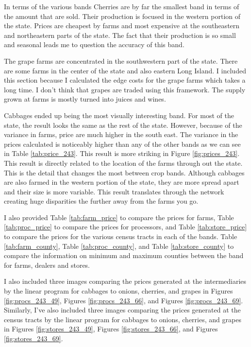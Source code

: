\documentclass{report}
\begin{document}
In terms of the various bands Cherries are by far the smallest band in terms of the amount that are sold. Their production is focused in the western portion of the state. Prices are cheapest by farms and most expensive at the southeastern and northeastern parts of the state. The fact that their production is so small and seasonal leads me to question the accuracy of this band. 

The grape farms are concentrated in the southwestern part of the state. There are some farms in the center of the state and also eastern Long Island. I included this section because I calculated the edge costs for the grape farms which takes a long time. I don't think that grapes  are traded using this framework. The supply grown at farms is mostly turned into juices and wines.

Cabbages ended up being the most visually interesting band. For most of the state, the result looks the same as the rest of the state. However, because of the variance in farms, price are much higher in the south east. The variance in the prices calculated is noticeably higher than any of the other bands as we can see in Table \ref{tab:price_243}. This result is more striking in Figure \ref{fig:prices_243}. This result is directly related to the location of the farms through out the state. This is the detail that changes the most between crop bands. Although cabbages are also farmed in the western portion of the state, they are more spread apart and their size is more variable. This result translates through the network creating huge disparities the further away from the farms you go.

I also provided Table \ref{tab:farm_price} to compare the prices for farms, Table \ref{tab:proc_price} to compare the prices for processors, and Table \ref{tab:store_price} to compare the prices for the various census tracts in each of the bands. Table \ref{tab:farm_county}, Table \ref{tab:proc_county}, and Table \ref{tab:store_county} to compare the information on minimum and maximum counties between the band for farms, dealers and stores.

I also included three images comparing the prices generated at the intermediaries by the linear program for cabbages to onions, cherries, and grapes in Figures \ref{fig:procs_243_49}, Figures \ref{fig:procs_243_66}, and Figures \ref{fig:procs_243_69}. Similarly, I've also included three images comparing the prices generated at the census tracts by the linear program for cabbages to onions, cherries, and grapes in Figures \ref{fig:stores_243_49}, Figures \ref{fig:stores_243_66}, and Figures \ref{fig:stores_243_69}.
\end{document}
